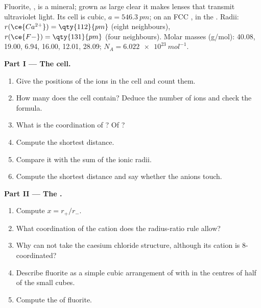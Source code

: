 \begin{problem}
\label{pb:b1:crystals-ionic-covalent:1}
Fluorite, , is a mineral; grown as large clear  it makes
lenses that transmit ultraviolet light. Its cell is cubic, $a =
\qty{546.3}{pm}$;  on an FCC ,  in the
. Radii: $r(\ce{Ca^{2+}}) = \qty{112}{pm}$ (eight
neighbours), $r(\ce{F-}) = \qty{131}{pm}$ (four neighbours). Molar masses
(g/mol):  40.08,  19.00,  6.94,  16.00, 
12.01,  28.09; $N_A = \qty{6.022e23}{mol^{-1}}$.

\medskip
\noindent\textbf{Part I --- The cell.}
\begin{enumerate}
  \item Give the positions of the  ions in the cell and count
        them.
  \item How many  does the cell contain? Deduce the
        number of  ions and check the formula.
  \item What is the coordination of ? Of ?
  \item Compute the shortest  distance.
  \item Compare it with the sum of the ionic radii.
  \item Compute the shortest  distance and say whether the
        anions touch.
\end{enumerate}

\medskip
\noindent\textbf{Part II --- The .}
\begin{enumerate}[resume]
  \item Compute $x = r_+/r_-$.
  \item What coordination of the cation does the radius-ratio rule allow?
  \item Why can  not take the caesium chloride structure, although
        its cation is 8-coordinated?
  \item Describe fluorite as a simple cubic arrangement of  with
         in the centres of half of the small cubes.
  \item Compute the  of fluorite.
\end{enumerate}


\end{problem}
